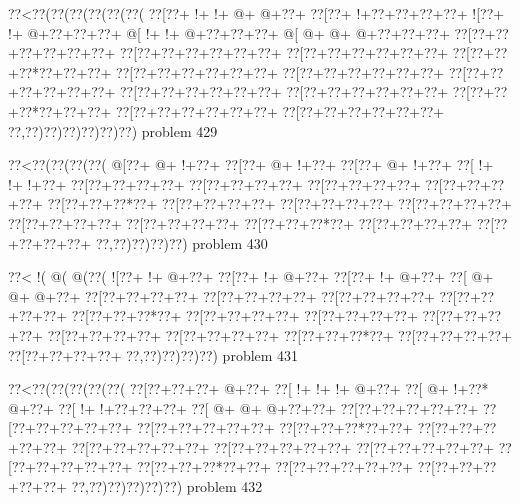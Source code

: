 \vbox{\vbox{\goo
\0??<\0??(\0??(\0??(\0??(\0??(\0??(
\0??[\0??+\- !+\- !+\- @+\- @+\0??+
\0??[\0??+\- !+\0??+\0??+\0??+\0??+
\- ![\0??+\- !+\- @+\0??+\0??+\0??+
\- @[\- !+\- !+\- @+\0??+\0??+\0??+
\- @[\- @+\- @+\- @+\0??+\0??+\0??+
\0??[\0??+\0??+\0??+\0??+\0??+\0??+
\0??[\0??+\0??+\0??+\0??+\0??+\0??+
\0??[\0??+\0??+\0??+\0??+\0??+\0??+
\0??[\0??+\0??+\0??*\0??+\0??+\0??+
\0??[\0??+\0??+\0??+\0??+\0??+\0??+
\0??[\0??+\0??+\0??+\0??+\0??+\0??+
\0??[\0??+\0??+\0??+\0??+\0??+\0??+
\0??[\0??+\0??+\0??+\0??+\0??+\0??+
\0??[\0??+\0??+\0??+\0??+\0??+\0??+
\0??[\0??+\0??+\0??*\0??+\0??+\0??+
\0??[\0??+\0??+\0??+\0??+\0??+\0??+
\0??[\0??+\0??+\0??+\0??+\0??+\0??+
\0??,\0??)\0??)\0??)\0??)\0??)\0??)
}
\hfil problem 429\hfil\break
}

\vbox{\vbox{\goo
\0??<\0??(\0??(\0??(\0??(
\- @[\0??+\- @+\- !+\0??+
\0??[\0??+\- @+\- !+\0??+
\0??[\0??+\- @+\- !+\0??+
\0??[\- !+\- !+\- !+\0??+
\0??[\0??+\0??+\0??+\0??+
\0??[\0??+\0??+\0??+\0??+
\0??[\0??+\0??+\0??+\0??+
\0??[\0??+\0??+\0??+\0??+
\0??[\0??+\0??+\0??*\0??+
\0??[\0??+\0??+\0??+\0??+
\0??[\0??+\0??+\0??+\0??+
\0??[\0??+\0??+\0??+\0??+
\0??[\0??+\0??+\0??+\0??+
\0??[\0??+\0??+\0??+\0??+
\0??[\0??+\0??+\0??*\0??+
\0??[\0??+\0??+\0??+\0??+
\0??[\0??+\0??+\0??+\0??+
\0??,\0??)\0??)\0??)\0??)
}
\hfil problem 430\hfil\break
}

\vbox{\vbox{\goo
\0??<\- !(\- @(\- @(\0??(
\- ![\0??+\- !+\- @+\0??+
\0??[\0??+\- !+\- @+\0??+
\0??[\0??+\- !+\- @+\0??+
\0??[\- @+\- @+\- @+\0??+
\0??[\0??+\0??+\0??+\0??+
\0??[\0??+\0??+\0??+\0??+
\0??[\0??+\0??+\0??+\0??+
\0??[\0??+\0??+\0??+\0??+
\0??[\0??+\0??+\0??*\0??+
\0??[\0??+\0??+\0??+\0??+
\0??[\0??+\0??+\0??+\0??+
\0??[\0??+\0??+\0??+\0??+
\0??[\0??+\0??+\0??+\0??+
\0??[\0??+\0??+\0??+\0??+
\0??[\0??+\0??+\0??*\0??+
\0??[\0??+\0??+\0??+\0??+
\0??[\0??+\0??+\0??+\0??+
\0??,\0??)\0??)\0??)\0??)
}
\hfil problem 431\hfil\break
}

\vbox{\vbox{\goo
\0??<\0??(\0??(\0??(\0??(\0??(
\0??[\0??+\0??+\0??+\- @+\0??+
\0??[\- !+\- !+\- !+\- @+\0??+
\0??[\- @+\- !+\0??*\- @+\0??+
\0??[\- !+\- !+\0??+\0??+\0??+
\0??[\- @+\- @+\- @+\0??+\0??+
\0??[\0??+\0??+\0??+\0??+\0??+
\0??[\0??+\0??+\0??+\0??+\0??+
\0??[\0??+\0??+\0??+\0??+\0??+
\0??[\0??+\0??+\0??*\0??+\0??+
\0??[\0??+\0??+\0??+\0??+\0??+
\0??[\0??+\0??+\0??+\0??+\0??+
\0??[\0??+\0??+\0??+\0??+\0??+
\0??[\0??+\0??+\0??+\0??+\0??+
\0??[\0??+\0??+\0??+\0??+\0??+
\0??[\0??+\0??+\0??*\0??+\0??+
\0??[\0??+\0??+\0??+\0??+\0??+
\0??[\0??+\0??+\0??+\0??+\0??+
\0??,\0??)\0??)\0??)\0??)\0??)
}
\hfil problem 432\hfil\break
}

